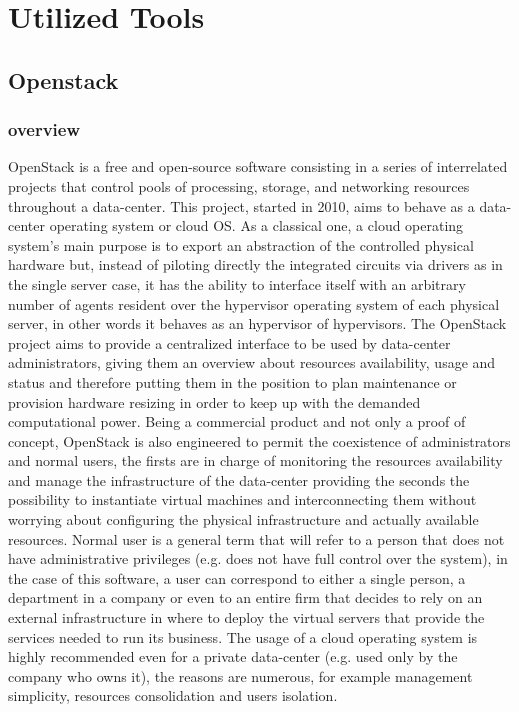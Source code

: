 \chapter{Utilized Tools}
\label{chap:Utilized Tools}


\section{Openstack}
\label{sec:openstack}
\subsection{overview}
OpenStack is a free and open-source software consisting in a series of interrelated projects that control pools of processing, storage, and networking resources throughout a data-center.
This project, started in 2010, aims to behave as a data-center operating system or cloud OS.
As a classical one, a cloud operating system's main purpose is to export an abstraction of the controlled physical hardware but, instead of piloting directly the integrated circuits via drivers as in the single server case, it has the ability to interface itself with an arbitrary number of agents resident over the hypervisor operating system of each physical server, in other words it behaves as an hypervisor of hypervisors.
The OpenStack project aims to provide a centralized interface to be used by data-center administrators, giving them an overview about resources  availability, usage and status and therefore putting them in the position to plan maintenance or provision hardware resizing in order to keep up with the demanded computational power.
Being a commercial product and not only a proof of concept, OpenStack is also engineered to permit the coexistence of administrators and normal users, the firsts are in charge of monitoring the resources availability and manage the infrastructure of the data-center providing the seconds the possibility to instantiate virtual machines and interconnecting them without worrying about configuring the physical infrastructure and actually available resources.
Normal user is a general term that will refer to a person that does not have administrative privileges (e.g. does not have full control over the system), in the case of this software, a user can correspond to either a single person, a department in a company or even to an entire firm that decides to rely on an external infrastructure in where to deploy the virtual servers that provide the services needed to run its business.
The usage of a cloud operating system is highly recommended even for a private data-center (e.g. used only by the company who owns it), the reasons are numerous, for example management simplicity, resources consolidation and users isolation.
